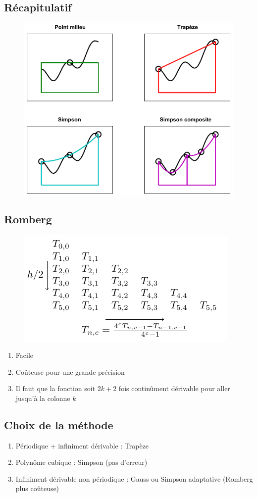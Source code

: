 \documentclass[resume]{subfiles}
\begin{document}
	\subsection{Récapitulatif}
	\begin{figure}[H]
	\centering
	\includegraphics[width=\columnwidth]{img_8.pdf}
	\end{figure}
	\subsection{Romberg}
	\begin{figure}[H]
	\centering
	\includegraphics[scale=1]{drwg_5.pdf}
	\end{figure}
	
	\begin{enumerate}
	\item Facile
	\item Coûteuse pour une grande précision
	\item Il faut que la fonction soit $2k+2$ fois continûment dérivable pour aller jusqu'à la colonne $k$
	\end{enumerate}
	\subsection{Choix de la méthode}
	\begin{enumerate}
	\item Périodique + infiniment dérivable : Trapèze
	\item Polynôme cubique : Simpson (pas d'erreur)
	\item Infiniment dérivable non périodique : Gauss ou Simpson adaptative (Romberg plus coûteuse)
	\end{enumerate}  
\end{document}
